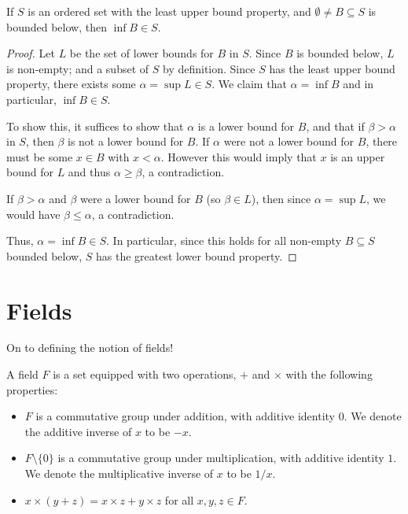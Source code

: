 \begin{theorem}
If $S$ is an ordered set with the least upper bound property, and $\emptyset \ne B \subseteq S$ is bounded below, then $\inf B \in S$. 
\begin{proof}
Let $L$ be the set of lower bounds for $B$ in $S$. Since $B$ is bounded below, $L$ is non-empty; and a subset of $S$ by definition. Since $S$ has the least upper bound property, there exists some $\alpha = \sup L \in S$. We claim that $\alpha = \inf B$ and in particular, $\inf B \in S$.

To show this, it suffices to show that $\alpha$ is a lower bound for $B$, and that if $\beta > \alpha$ in $S$, then $\beta$ is not a lower bound for $B$. If $\alpha$ were not a lower bound for $B$, there must be some $x \in B$ with $x < \alpha$. However this would imply that $x$ is an upper bound for $L$ and thus $\alpha \ge \beta$, a contradiction. 

If $\beta > \alpha$ and $\beta$ were a lower bound for $B$ (so $\beta \in L$), then since $\alpha = \sup L$, we would have $\beta \le \alpha$, a contradiction.

Thus, $\alpha = \inf B \in S$. In particular, since this holds for all non-empty $B \subseteq S$ bounded below, $S$ has the greatest lower bound property.
\end{proof}
\end{theorem}

\section{Fields}
On to defining the notion of fields!

\begin{definition}
A field $F$ is a set equipped with two operations, $+$ and $\times$ with the following properties:
\begin{itemize}
\item $F$ is a commutative group under addition, with additive identity $0$. We denote the additive inverse of $x$ to be $-x$.
\item $F \setminus \{0\}$ is a commutative group under multiplication, with additive identity $1$. We denote the multiplicative inverse of $x$ to be $1/x$. 
\item $x \times (y + z) = x \times z + y \times z$ for all $x, y, z \in F$. 
\end{itemize}
\end{definition}

